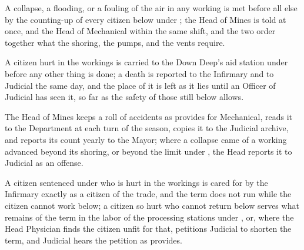 \begin{setopen}
\begin{clauses}
\item A collapse, a flooding, or a fouling of the air in any working is met before all else by the counting-up of every citizen below under ; the Head of Mines is told at once, and the Head of Mechanical within the same shift, and the two order together what the shoring, the pumps, and the vents require.
\item A citizen hurt in the workings is carried to the Down Deep's aid station under  before any other thing is done; a death is reported to the Infirmary and to Judicial the same day, and the place of it is left as it lies until an Officer of Judicial has seen it, so far as the safety of those still below allows.
\item The Head of Mines keeps a roll of accidents as  provides for Mechanical, reads it to the Department at each turn of the season, copies it to the Judicial archive, and reports its count yearly to the Mayor; where a collapse came of a working advanced beyond its shoring, or beyond the limit under , the Head reports it to Judicial as an offense.
\item A citizen sentenced under  who is hurt in the workings is cared for by the Infirmary exactly as a citizen of the trade, and the term does not run while the citizen cannot work below; a citizen so hurt who cannot return below serves what remains of the term in the labor of the processing stations under , or, where the Head Physician finds the citizen unfit for that, petitions Judicial to shorten the term, and Judicial hears the petition as  provides.
\end{clauses}
\end{setopen}
